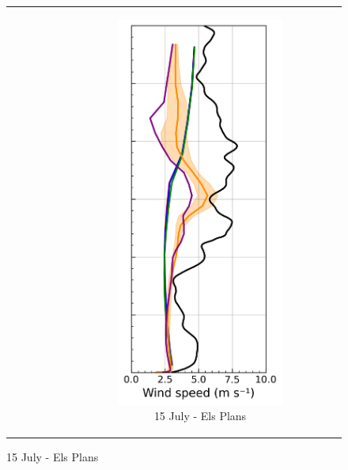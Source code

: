 \begin{figure}[hbtp]
{\begin{tabular}{@{}cccc@{}}
\begin{subfigure}[t]{0.289\textwidth}
        \end{subfigure} &
        \begin{subfigure}[t]{0.283\textwidth}
            \caption{15 July - Els Plans}
            \includegraphics[width=\textwidth]{images/chap6/profiles/profile_elsplans_wind_speed_1507_.png}

\end{subfigure}
\end{tabular}}
\end{figure}
